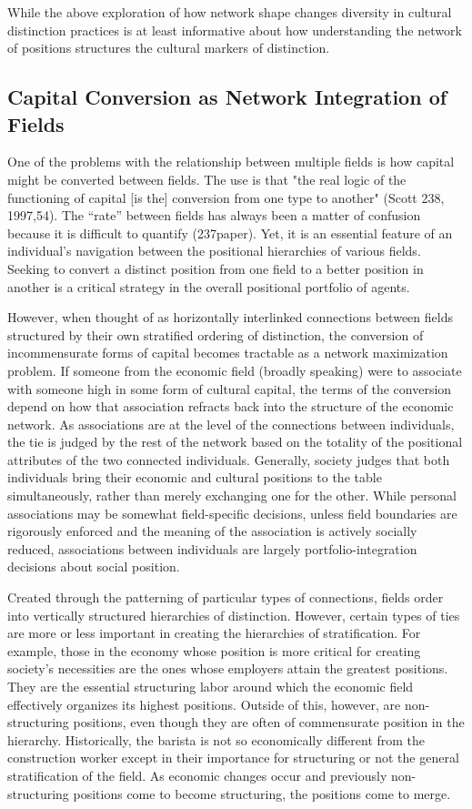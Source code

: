 \documentclass[12pt]{article}
\begin{document}
While the above exploration of how network shape changes diversity in cultural distinction practices is at least informative about how understanding the network of positions structures the cultural markers of distinction. 

\subsection{Capital Conversion as Network Integration of Fields}

One of the problems with the relationship between multiple fields is how capital might be converted between fields. The use is that "the real logic of the functioning of capital [is the] conversion from one type to another" (Scott 238, 1997,54). The ``rate'' between fields has always been a matter of confusion because it is difficult to quantify (237paper). Yet, it is an essential feature of an individual's navigation between the positional hierarchies of various fields. Seeking to convert a distinct position from one field to a better position in another is a critical strategy in the overall positional portfolio of agents.

However, when thought of as horizontally interlinked connections between fields structured by their own stratified ordering of distinction, the conversion of incommensurate forms of capital becomes tractable as a network maximization problem. If someone from the economic field (broadly speaking) were to associate with someone high in some form of cultural capital, the terms of the conversion depend on how that association refracts back into the structure of the economic network. As associations are at the level of the connections between individuals, the tie is judged by the rest of the network based on the totality of the positional attributes of the two connected individuals. Generally, society judges that both individuals bring their economic and cultural positions to the table simultaneously, rather than merely exchanging one for the other. While personal associations may be somewhat field-specific decisions, unless field boundaries are rigorously enforced and the meaning of the association is actively socially reduced, associations between individuals are largely portfolio-integration decisions about social position. 

Created through the patterning of particular types of connections, fields order into vertically structured hierarchies of distinction. However, certain types of ties are more or less important in creating the hierarchies of stratification. For example, those in the economy whose position is more critical for creating society's necessities are the ones whose employers attain the greatest positions. They are the essential structuring labor around which the economic field effectively organizes its highest positions. Outside of this, however, are non-structuring positions, even though they are often of commensurate position in the hierarchy. Historically, the barista is not so economically different from the construction worker except in their importance for structuring or not the general stratification of the field. As economic changes occur and previously non-structuring positions come to become structuring, the positions come to merge. 
\end{document}
